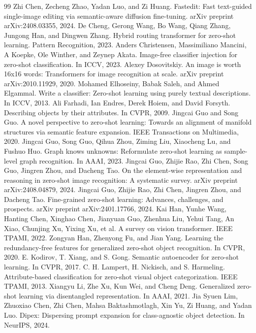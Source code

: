 \begin{thebibliography}{99}
 Zhi Chen, Zecheng Zhao, Yadan Luo, and Zi Huang. Fastedit: Fast text-guided single-image editing via semantic-aware diffusion fine-tuning. arXiv preprint arXiv:2408.03355, 2024.
 De Cheng, Gerong Wang, Bo Wang, Qiang Zhang, Jungong Han, and Dingwen Zhang. Hybrid routing transformer for zero-shot learning. Pattern Recognition, 2023.
 Anders Christensen, Massimiliano Mancini, A Koepke, Ole Winther, and Zeynep Akata. Image-free classifier injection for zero-shot classification. In ICCV, 2023.
 Alexey Dosovitskiy. An image is worth 16x16 words: Transformers for image recognition at scale. arXiv preprint arXiv:2010.11929, 2020.
 Mohamed Elhoseiny, Babak Saleh, and Ahmed Elgammal. Write a classifier: Zero-shot learning using purely textual descriptions. In ICCV, 2013.
 Ali Farhadi, Ian Endres, Derek Hoiem, and David Forsyth. Describing objects by their attributes. In CVPR, 2009.
 Jingcai Guo and Song Guo. A novel perspective to zero-shot learning: Towards an alignment of manifold structures via semantic feature expansion. IEEE Transactions on Multimedia, 2020.
 Jingcai Guo, Song Guo, Qihua Zhou, Ziming Liu, Xiaocheng Lu, and Fushuo Huo. Graph knows unknowns: Reformulate zero-shot learning as sample-level graph recognition. In AAAI, 2023.
 Jingcai Guo, Zhijie Rao, Zhi Chen, Song Guo, Jingren Zhou, and Dacheng Tao. On the element-wise representation and reasoning in zero-shot image recognition: A systematic survey. arXiv preprint arXiv:2408.04879, 2024.
 Jingcai Guo, Zhijie Rao, Zhi Chen, Jingren Zhou, and Dacheng Tao. Fine-grained zero-shot learning: Advances, challenges, and prospects. arXiv preprint arXiv:2401.17766, 2024.
 Kai Han, Yunhe Wang, Hanting Chen, Xinghao Chen, Jianyuan Guo, Zhenhua Liu, Yehui Tang, An Xiao, Chunjing Xu, Yixing Xu, et al. A survey on vision transformer. IEEE TPAMI, 2022.
 Zongyan Han, Zhenyong Fu, and Jian Yang. Learning the redundancy-free features for generalized zero-shot object recognition. In CVPR, 2020.
 E. Kodirov, T. Xiang, and S. Gong. Semantic autoencoder for zero-shot learning. In CVPR, 2017.
 C. H. Lampert, H. Nickisch, and S. Harmeling. Attribute-based classification for zero-shot visual object categorization. IEEE TPAMI, 2013.
 Xiangyu Li, Zhe Xu, Kun Wei, and Cheng Deng. Generalized zero-shot learning via disentangled representation. In AAAI, 2021.
 Jia Syuen Lim, Zhuoxiao Chen, Zhi Chen, Mahsa Baktashmotlagh, Xin Yu, Zi Huang, and Yadan Luo. Dipex: Dispersing prompt expansion for class-agnostic object detection. In NeurIPS, 2024.

\end{thebibliography}
